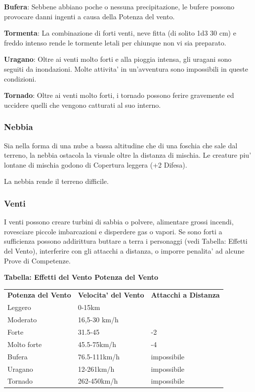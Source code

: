 \documentclass[a4paper,11pt,twoside,openany]{book}
\begin{document}
{		\textbf{Bufera}: Sebbene abbiano poche o nessuna precipitazione, le bufere possono provocare danni ingenti a causa della Potenza del vento.
		
		\textbf{Tormenta}: La combinazione di forti venti, neve fitta (di solito 1d3 \texttimes{} 30 cm) e freddo intenso rende le tormente letali per chiunque non vi sia preparato. 
		
		\textbf{Uragano}: Oltre ai venti molto forti e alla pioggia intensa, gli uragani sono seguiti da inondazioni. Molte attivita' in un'avventura sono impossibili in queste condizioni.
		
		\textbf{Tornado}: Oltre ai venti molto forti, i tornado possono ferire gravemente ed uccidere quelli che vengono catturati al suo interno.
		
		\subsubsection{Nebbia}
		
		\label{nebbia}
		
		Sia nella forma di una nube a bassa altitudine che di una foschia che sale dal terreno, la nebbia ostacola la visuale oltre la distanza di mischia. Le creature piu' lontane di mischia godono di Copertura leggera (+2 Difesa).
		
		La nebbia rende il terreno difficile.
		
		
		\subsubsection{Venti}
		
		\label{venti}
		
		I venti possono creare turbini di sabbia o polvere, alimentare grossi incendi, rovesciare piccole imbarcazioni e disperdere gas o vapori. Se sono forti a sufficienza possono addirittura buttare a terra i personaggi (vedi Tabella: Effetti del Vento), interferire con gli attacchi a distanza, o imporre penalita' ad alcune Prove di Competenze.
		
		\textbf{Tabella: Effetti del Vento Potenza del Vento}
		
		\medskip
		
		\begin{tabular}{lll}
			\toprule
			\textbf{Potenza del Vento} & \textbf{Velocita' del Vento} & \textbf{Attacchi a Distanza}\\
			Leggero & 0-15km \tabularnewline
			Moderato & 16,5-30 km/h  \tabularnewline
			Forte & 31.5-45 & -2 \tabularnewline
			Molto forte & 45.5-75km/h & -4 \tabularnewline
			Bufera & 76.5-111km/h & impossibile  \tabularnewline
			Uragano & 12-261km/h & impossibile \tabularnewline
			Tornado & 262-450km/h & impossibile\tabularnewline
		\end{tabular}
		
}
\end{document}
